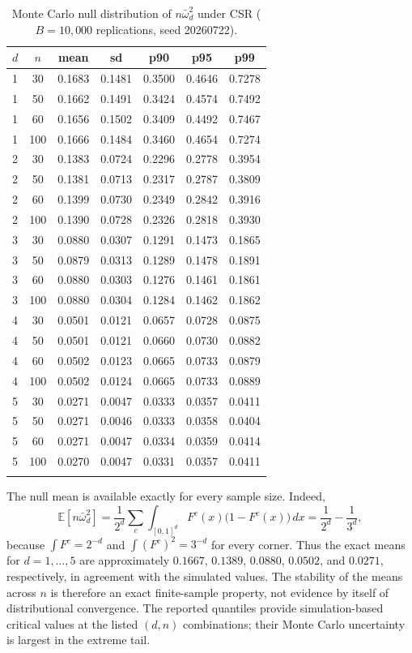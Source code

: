 \documentclass[pdflatex]{sn-jnl}
\theoremstyle{thmstyleone}
\theoremstyle{thmstyletwo}
\theoremstyle{thmstylethree}
\newcommand{\E}{\mathbb{E}}
\begin{document}
\begin{table}[htbp]
\caption{Monte Carlo null distribution of $n\bar\omega^2_d$ under CSR ($B=10{,}000$ replications, seed 20260722).}\label{tab:montecarlo}
\begin{tabular*}{\textwidth}{@{\extracolsep\fill}lcccccc}
\toprule
$d$ & $n$ & mean & sd & p90 & p95 & p99 \\
\midrule
1 & 30  & 0.1683 & 0.1481 & 0.3500 & 0.4646 & 0.7278 \\
1 & 50  & 0.1662 & 0.1491 & 0.3424 & 0.4574 & 0.7492 \\
1 & 60  & 0.1656 & 0.1502 & 0.3409 & 0.4492 & 0.7467 \\
1 & 100 & 0.1666 & 0.1484 & 0.3460 & 0.4654 & 0.7274 \\
2 & 30  & 0.1383 & 0.0724 & 0.2296 & 0.2778 & 0.3954 \\
2 & 50  & 0.1381 & 0.0713 & 0.2317 & 0.2787 & 0.3809 \\
2 & 60  & 0.1399 & 0.0730 & 0.2349 & 0.2842 & 0.3916 \\
2 & 100 & 0.1390 & 0.0728 & 0.2326 & 0.2818 & 0.3930 \\
3 & 30  & 0.0880 & 0.0307 & 0.1291 & 0.1473 & 0.1865 \\
3 & 50  & 0.0879 & 0.0313 & 0.1289 & 0.1478 & 0.1891 \\
3 & 60  & 0.0880 & 0.0303 & 0.1276 & 0.1461 & 0.1861 \\
3 & 100 & 0.0880 & 0.0304 & 0.1284 & 0.1462 & 0.1862 \\
4 & 30  & 0.0501 & 0.0121 & 0.0657 & 0.0728 & 0.0875 \\
4 & 50  & 0.0501 & 0.0121 & 0.0660 & 0.0730 & 0.0882 \\
4 & 60  & 0.0502 & 0.0123 & 0.0665 & 0.0733 & 0.0879 \\
4 & 100 & 0.0502 & 0.0124 & 0.0665 & 0.0733 & 0.0889 \\
5 & 30  & 0.0271 & 0.0047 & 0.0333 & 0.0357 & 0.0411 \\
5 & 50  & 0.0271 & 0.0046 & 0.0333 & 0.0358 & 0.0404 \\
5 & 60  & 0.0271 & 0.0047 & 0.0334 & 0.0359 & 0.0414 \\
5 & 100 & 0.0270 & 0.0047 & 0.0331 & 0.0357 & 0.0411 \\
\botrule
\end{tabular*}
\end{table}

The null mean is available exactly for every sample size. Indeed,
\[
  \E[n\bar\omega_d^2]
  = \frac{1}{2^d}\sum_c\int_{[0,1]^d}F^c(x)\bigl(1-F^c(x)\bigr)\,dx
  = \frac{1}{2^d}-\frac{1}{3^d},
\]
because $\int F^c=2^{-d}$ and $\int(F^c)^2=3^{-d}$ for every corner. Thus the exact means for $d=1,\dots,5$ are approximately $0.1667$, $0.1389$, $0.0880$, $0.0502$, and $0.0271$, respectively, in agreement with the simulated values. The stability of the means across $n$ is therefore an exact finite-sample property, not evidence by itself of distributional convergence. The reported quantiles provide simulation-based critical values at the listed $(d,n)$ combinations; their Monte Carlo uncertainty is largest in the extreme tail.
\end{document}

